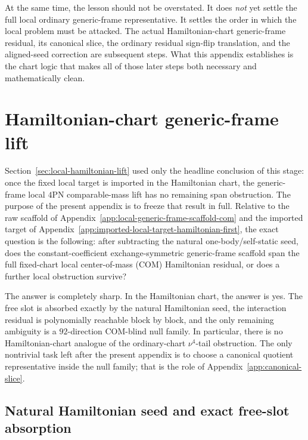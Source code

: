 \documentclass[11pt]{article}
\begin{document}
At the same time, the lesson should not be overstated.  It does \emph{not} yet
settle the full local ordinary generic-frame representative.  It settles the
order in which the local problem must be attacked.  The actual Hamiltonian-chart
generic-frame residual, its canonical slice, the ordinary residual sign-flip
translation, and the aligned-seed correction are subsequent steps.  What this
appendix establishes is the chart logic that makes all of those later steps both
necessary and mathematically clean.


\section{Hamiltonian-chart generic-frame lift}
\label{app:hamiltonian-lift}

Section~\ref{sec:local-hamiltonian-lift} used only the headline conclusion of
this stage: once the fixed local target is imported in the Hamiltonian chart,
the generic-frame local $4$PN comparable-mass lift has no remaining span
obstruction.  The purpose of the present appendix is to freeze that result in
full.  Relative to the raw scaffold of
Appendix~\ref{app:local-generic-frame-scaffold-com} and the imported target of
Appendix~\ref{app:imported-local-target-hamiltonian-first}, the exact question
is the following: after subtracting the natural one-body/self-static seed, does
the constant-coefficient exchange-symmetric generic-frame scaffold span the full
fixed-chart local center-of-mass (COM) Hamiltonian residual, or does a further
local obstruction survive?

The answer is completely sharp.  In the Hamiltonian chart, the answer is yes.
The free slot is absorbed exactly by the natural Hamiltonian seed, the
interaction residual is polynomially reachable block by block, and the only
remaining ambiguity is a $92$-direction COM-blind null family.  In particular,
there is no Hamiltonian-chart analogue of the ordinary-chart $\nu^4$-tail
obstruction.  The only nontrivial task left after the present appendix is to
choose a canonical quotient representative inside the null family; that is the
role of Appendix~\ref{app:canonical-slice}.

\subsection{Natural Hamiltonian seed and exact free-slot absorption}
\label{app:hamiltonian-lift-seed}
\end{document}
